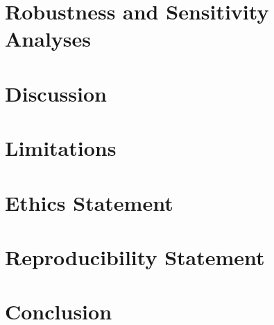 \documentclass[11pt]{article}
\begin{document}
\section{Robustness and Sensitivity Analyses}

\section{Discussion}

\section{Limitations}

\section*{Ethics Statement}

\section*{Reproducibility Statement}

\section{Conclusion}


\end{document}
